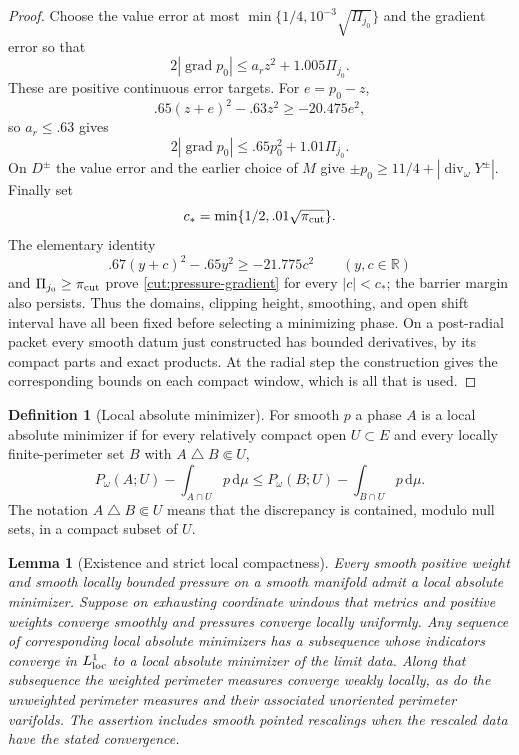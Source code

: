 \documentclass[11pt]{article}
\numberwithin{equation}{section}
\newtheorem{lemma}[theorem]{Lemma}
\theoremstyle{definition}
\newtheorem{definition}[theorem]{Definition}
\theoremstyle{remark}
\begin{document}
\begin{proof}
Choose the value error at most
$\min\{1/4,10^{-3}\sqrt{\Pi_{j_0}}\}$ and the gradient error so that
\[
 2|\operatorname{grad} p_0|\le a_rz^2+1.005\Pi_{j_0}.
\]
These are positive continuous error targets.  For $e=p_0-z$,
\[
 .65(z+e)^2-.63z^2\ge-20.475e^2,
\]
so $a_r\le .63$ gives
\[
             2|\operatorname{grad} p_0|\le .65p_0^2+1.01\Pi_{j_0}.
\]
On $D^\pm$ the value error and the earlier choice of $M$ give
$\pm p_0\ge 11/4+|\operatorname{div}_\omega Y^\pm|$.  Finally set
\[
           c_* =\min\{1/2,.01\sqrt{\pi_{\rm cut}}\}.
\]
The elementary identity
\[
 .67(y+c)^2-.65y^2\ge-21.775c^2\qquad(y,c\in\mathbb R)
\]
and $\Pi_{j_0}\ge\pi_{\rm cut}$ prove
\eqref{cut:pressure-gradient} for every $|c|<c_*$; the barrier margin
also persists.  Thus the domains, clipping height, smoothing, and open
shift interval have all been fixed before selecting a minimizing phase.
On a post-radial packet every smooth datum just constructed has bounded
derivatives, by its compact parts and exact products.  At the radial
step the construction gives the corresponding bounds on each compact
window, which is all that is used.
\end{proof}

\begin{definition}[Local absolute minimizer]\label{cut:minimizer-definition}
For smooth $p$ a phase $A$ is a local absolute minimizer if for every
relatively compact open $U\subset E$ and every locally finite-perimeter
set $B$ with $A\mathbin\triangle B\Subset U$,
\begin{equation}\label{cut:local-minimality}
 P_\omega(A;U)-\int_{A\cap U}p\,\mathrm d\mu
 \le P_\omega(B;U)-\int_{B\cap U}p\,\mathrm d\mu.
\end{equation}
The notation $A\mathbin\triangle B\Subset U$ means that the discrepancy
is contained, modulo null sets, in a compact subset of $U$.
\end{definition}

\begin{lemma}[Existence and strict local compactness]\label{cut:bv-compactness}
Every smooth positive weight and smooth locally bounded pressure on a
smooth manifold admit a local absolute minimizer.  Suppose on exhausting
coordinate windows that metrics and positive weights converge smoothly
and pressures converge locally uniformly.  Any sequence of corresponding
local absolute minimizers has a subsequence whose indicators converge in
$L^1_{\rm loc}$ to a local absolute minimizer of the limit data.  Along
that subsequence the weighted perimeter measures converge weakly locally,
as do the unweighted perimeter measures and their associated unoriented
perimeter varifolds.  The assertion includes smooth pointed rescalings
when the rescaled data have the stated convergence.
\end{lemma}
\end{document}

